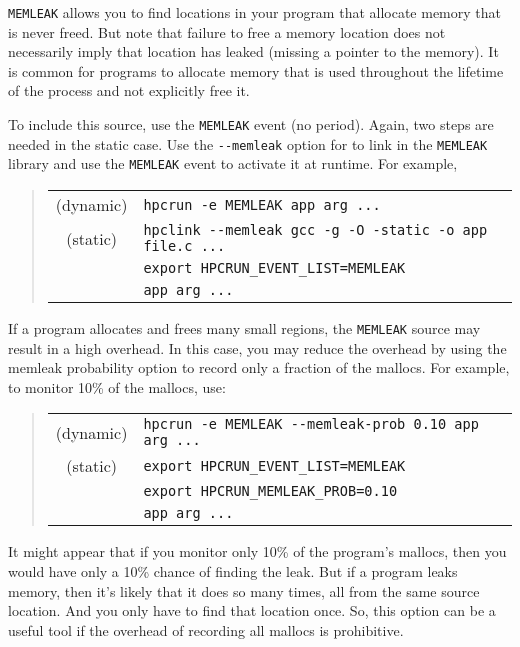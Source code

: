 \verb|MEMLEAK| allows you to find locations in your program that
allocate memory that is never freed.  But note that failure to free a
memory location does not necessarily imply that location has leaked
(missing a pointer to the memory).  It is common for programs to
allocate memory that is used throughout the lifetime of the process
and not explicitly free it.

To include this source, use the \verb|MEMLEAK| event (no period).
Again, two steps are needed in the static case.  Use the \verb|--memleak|
option for \hpclink{} to link in the \verb|MEMLEAK| library
and use the \verb|MEMLEAK| event to activate it at runtime.  For
example,

\begin{quote}
\begin{tabular}{@{}cl}
(dynamic) & \verb|hpcrun -e MEMLEAK app arg ...| \\
(static)  & \verb|hpclink --memleak gcc -g -O -static -o app file.c ...| \\
& \verb|export HPCRUN_EVENT_LIST=MEMLEAK| \\
& \verb|app arg ...|
\end{tabular}
\end{quote}

If a program allocates and frees many small regions, the \verb|MEMLEAK|
source may result in a high overhead.  In this case, you may reduce
the overhead by using the memleak probability option to record only a
fraction of the mallocs.  For example, to monitor 10\% of the mallocs,
use:

\begin{quote}
\begin{tabular}{@{}cl}
(dynamic) & \verb|hpcrun -e MEMLEAK --memleak-prob 0.10 app arg ...| \\
(static)  & \verb|export HPCRUN_EVENT_LIST=MEMLEAK| \\
& \verb|export HPCRUN_MEMLEAK_PROB=0.10| \\
& \verb|app arg ...|
\end{tabular}
\end{quote}

It might appear that if you monitor only 10\% of the program's
mallocs, then you would have only a 10\% chance of finding the leak.
But if a program leaks memory, then it's likely that it does so many
times, all from the same source location.  And you only have to find
that location once.  So, this option can be a useful tool if the
overhead of recording all mallocs is prohibitive.

